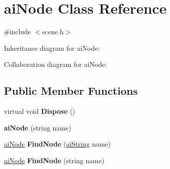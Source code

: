 \hypertarget{structai_node}{\section{ai\+Node Class Reference}
\label{structai_node}
}


{\ttfamily \#include $<$scene.\+h$>$}



Inheritance diagram for ai\+Node\+:


Collaboration diagram for ai\+Node\+:
\subsection*{Public Member Functions}
\begin{DoxyCompactItemize}
\item 
\hypertarget{structai_node_ad827db404a3a197d67c10edefa2ac665}{virtual void {\bfseries Dispose} ()}\label{structai_node_ad827db404a3a197d67c10edefa2ac665}

\item 
\hypertarget{structai_node_a4004bcfb97eb1fb277736e656aa74340}{{\bfseries ai\+Node} (string name)}\label{structai_node_a4004bcfb97eb1fb277736e656aa74340}

\item 
\hypertarget{structai_node_a65d339386c0462c851f8885ad1101df6}{\hyperlink{structai_node}{ai\+Node} {\bfseries Find\+Node} (\hyperlink{structai_string}{ai\+String} name)}\label{structai_node_a65d339386c0462c851f8885ad1101df6}

\item 
\hypertarget{structai_node_ac0312bff9424c8a9560e43a26917c6ef}{\hyperlink{structai_node}{ai\+Node} {\bfseries Find\+Node} (string name)}\label{structai_node_ac0312bff9424c8a9560e43a26917c6ef}

\end{DoxyCompactItemize}

